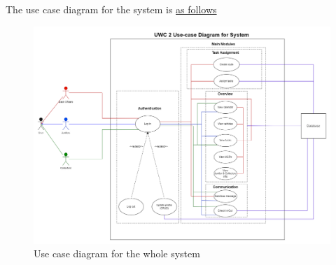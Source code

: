 \documentclass[a4paper]{article}
\begin{document}
The use case diagram for the system is \hyperlink{pic1}{as follows}
\hypertarget{pic1}{
\begin{figure}
\centering
  \includegraphics[width=1\linewidth]{usecase-system.png}
  \caption{Use case diagram for the whole system}
\end{figure}}
\end{document}
